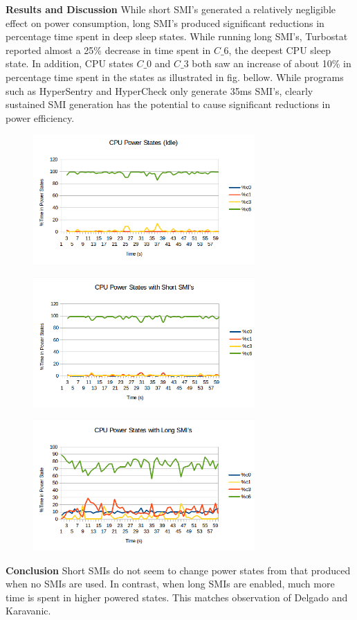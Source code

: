 \documentclass{IEEEtran}
\begin{document}
\textbf{Results and Discussion}
While short SMI’s generated a relatively negligible effect on power consumption, 
long SMI’s produced significant reductions in percentage time spent in deep sleep states. 
While running long SMI’s, Turbostat reported almost a 25\% decrease in time spent in $C\_6$, the deepest CPU sleep state.
In addition, CPU states $C\_0$ and $C\_3$ both saw an increase of about 10\% 
in percentage time spent in the states as illustrated in fig. bellow. 
While programs such as HyperSentry and HyperCheck only generate 35ms SMI’s, 
clearly sustained SMI generation has the potential to cause significant reductions in power efficiency.
\begin{figure}[H]
\includegraphics[keepaspectratio=true,width=240pt]{wh_idle.png}
\caption{ }
\end{figure}
\begin{figure}[H]
\includegraphics[keepaspectratio=true,width=240pt]{wh_short.png}
\caption{ }
\end{figure}
\begin{figure}[H]
\includegraphics[keepaspectratio=true,width=240pt]{wh_long.png}
\caption{ }
\end{figure}
\textbf{Conclusion}
Short SMIs do not seem to change power states from that produced when no SMIs are used. In contrast, when long SMIs are enabled, much more time is spent in higher powered states.
This matches observation of Delgado and Karavanic.
\end{document}
